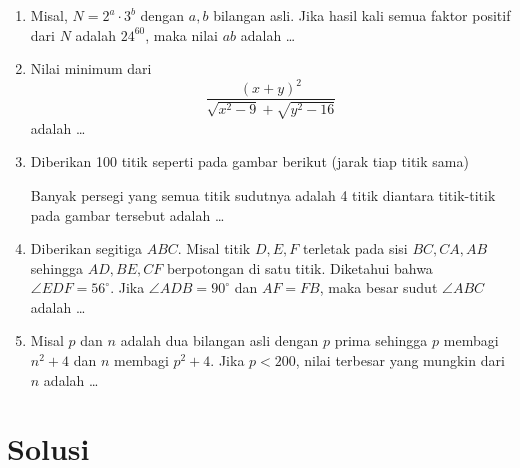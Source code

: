 \begin{enumerate}[resume]
\item Misal, $N = 2^a \cdot 3^b$ dengan $a, b$ bilangan asli. Jika hasil kali semua faktor positif dari $N$ adalah $24^{60}$, maka nilai $ab$ adalah \dots

\item Nilai minimum dari
$$\dfrac{(x+y)^2}{\sqrt{x^2-9}+\sqrt{y^2-16}}$$
adalah \dots

\item Diberikan 100 titik seperti pada gambar berikut (jarak tiap titik sama)
\begin{center}
\end{center}
Banyak persegi yang semua titik sudutnya adalah 4 titik diantara titik-titik pada gambar tersebut adalah \dots

\item Diberikan segitiga $ABC$. Misal titik $D,E,F$ terletak pada sisi $BC,CA,AB$ sehingga $AD,BE,CF$ berpotongan di satu titik. Diketahui bahwa $\angle EDF = 56^\circ$. Jika $\angle ADB = 90^\circ$ dan $AF=FB$, maka besar sudut $\angle ABC$ adalah \dots

\item Misal $p$ dan $n$ adalah dua bilangan asli dengan $p$ prima sehingga $p$ membagi $n^2+4$ dan $n$ membagi $p^2+4$. Jika $p<200$, nilai terbesar yang mungkin dari $n$ adalah \dots
\end{enumerate}

\newpage
\section{Solusi}

